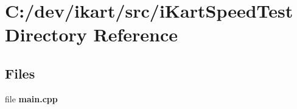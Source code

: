 \section{C\+:/dev/ikart/src/i\+Kart\+Speed\+Test Directory Reference}
\label{dir_0d809422b59c685fcb77601a1b4c3a06}
\subsection*{Files}
\begin{DoxyCompactItemize}
\item 
file {\bfseries main.\+cpp}
\end{DoxyCompactItemize}
